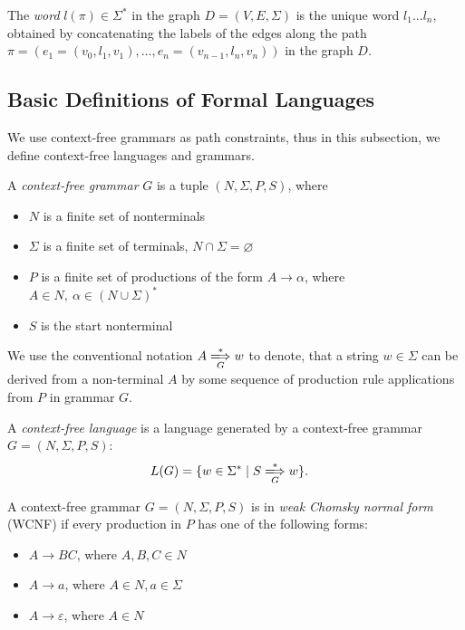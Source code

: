 \begin{definition}
	The \emph{word} $l(\pi) \in \Sigma^*$ in the graph $D=(V, E, \Sigma)$ is the unique word $l_1 ... l_n$, obtained by concatenating the labels of the edges along the	path $\pi = (e_1 = (v_0, l_1, v_1), \ldots, e_n = (v_{n-1}, l_n, v_n))$ in the graph $D$.
\end{definition}


\subsection{Basic Definitions of Formal Languages}
We use context-free grammars as path constraints, thus in this subsection, we define context-free languages and grammars.

\begin{definition}A \emph{context-free grammar} $G$ is a tuple $(N, \Sigma, P, S)$, where
\begin{itemize}
    \item $N$ is a finite set of nonterminals
    \item $\Sigma$ is a finite set of terminals, $N \cap \Sigma = \varnothing$
    \item $P$ is a finite set of productions of the form $A \to \alpha$, where $A \in N,\ \alpha \in (N \cup \Sigma)^*$
    \item $S$ is the start nonterminal
\end{itemize} 
\end{definition}

We use the conventional notation $A \xLongrightarrow[G]{*} w$ to denote, that a
string $w \in \Sigma$ can be derived from a non-terminal $A$ by some sequence of production rule applications from $P$ in grammar $G$.

\begin{definition} A \emph{context-free language} is a language generated by a context-free grammar $G=(N, \Sigma, P, S)$:
\begin{align*}
    L(G) &= \{w \in \Sigma^* \mid S \xLongrightarrow[G]{*} w \}.
\end{align*}
\end{definition}

\begin{definition} A context-free grammar $G = (N, \Sigma, P, S)$ is in \emph{weak Chomsky normal form} (WCNF) if every production in $P$ has one of the following forms:
    \begin{itemize}
        \item $A \rightarrow BC$, where $A, B, C \in N$
        \item  $A \rightarrow a$, where $A \in N, a \in \Sigma$
        \item $A \rightarrow \varepsilon$, where $A \in N$
    \end{itemize}
\end{definition}

